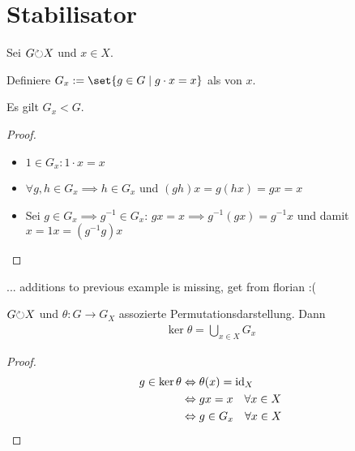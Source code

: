\section{Stabilisator}
Sei $G \Circlearrowleft X$ und $x \in X$.
\begin{definition}
	Definiere $G_x := \set{g \in G \mid g \cdot x = x}$ als  von $x$.
\end{definition}
\begin{lemma}
	Es gilt $G_x < G$.
\end{lemma}
\begin{proof}
	\begin{itemize}
		\item $1 \in G_x\colon 1 \cdot x = x$
		\item $\forall g,h \in G_x \implies h \in G_x$ und $(gh)x = g(hx) = gx = x$
		\item Sei $g \in G_x \implies g^{-1} \in G_x$: $gx = x \implies g^{-1}(gx) = g^{-1}x$ und damit $x = 1 x = (g^{-1}g)x$
	\end{itemize}
\end{proof}
... additions to previous example is missing, get from florian :(
\begin{lemma}
	$G \Circlearrowleft X$ und $\theta\colon G \to G_X$ assozierte Permutationsdarstellung. Dann
	\begin{align*}
	\ker \theta = \bigcup_{x \in X}G_x
	\end{align*}
\end{lemma}
\begin{proof}
	\begin{align*}
		g \in \ker \theta &\Leftrightarrow \theta(x) = \operatorname{id}_X\\
		&\Leftrightarrow g x = x \quad \forall x \in X\\
		&\Leftrightarrow g \in G_x \quad \forall x \in X
	\end{align*}
\end{proof}
